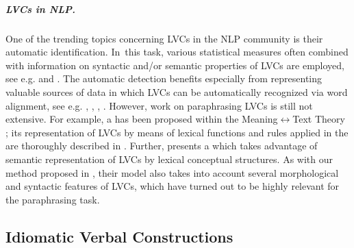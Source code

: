 \documentclass[output=paper,modfonts,nonflat]{langsci/langscibook}
\begin{document}
\subparagraph{LVCs in NLP.} 
One of the trending topics concerning LVCs in the NLP community is their automatic identification. In~this task, various statistical measures often 
combined with information on syntactic and/or semantic properties of LVCs are
employed, see e.g. \citet{Bannard:2007} and \citet{fazly:2005}. The automatic 
detection benefits especially from  representing valuable 
sources of data in which LVCs can be automatically recognized via word alignment, 
see e.g. \citet{Chen:2015}, \citet{Caseli2010}, \citet{Sinha:2009}, \citet{ZarrieB:2009}.     
However, work on paraphrasing LVCs is still not extensive. For example, a 
 has been proposed within the Meaning$\leftrightarrow$Text 
Theory \citep{ZolkovskijMelcuk65}; its representation of LVCs by means of lexical 
functions and rules applied in the  are thoroughly described in \citet{ramos-07}. 
Further, \citet{Fujita:2004} presents a  which 
takes advantage of semantic representation of LVCs by lexical conceptual structures. 
As with our method proposed in , their model also takes into 
account several morphological and syntactic features of LVCs, which have turned out 
to be highly relevant for the paraphrasing task.   

\subsection{Idiomatic Verbal Constructions}
\label{IVCs}
\end{document}

